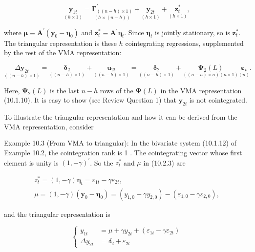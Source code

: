 \documentclass[10pt]{article}
\begin{document}
\begin{equation*}
\underset{(h \times 1)}{\mathbf{y}_{1 t}}=\underset{(h \times(n-h))}{\boldsymbol{\Gamma}_{((n-h) \times 1)}^{\prime}}+\underset{(h \times 1)}{\mathbf{y}_{2 t}}+\underset{(h \times 1)}{\mathbf{z}_{t}^{*}}, \tag{10.2.8}
\end{equation*}


where $\boldsymbol{\mu} \equiv \mathbf{A}^{\prime}\left(\mathbf{y}_{0}-\boldsymbol{\eta}_{0}\right)$ and $\mathbf{z}_{t}^{*} \equiv \mathbf{A}^{\prime} \boldsymbol{\eta}_{t}$. Since $\boldsymbol{\eta}_{t}$ is jointly stationary, so is $\mathbf{z}_{t}^{*}$. The triangular representation is these $h$ cointegrating regressions, supplemented by the rest of the VMA representation:


\begin{equation*}
\underset{((n-h) \times 1)}{\Delta \mathbf{y}_{2 t}}=\underset{((n-h) \times 1)}{\boldsymbol{\delta}_{2}}+\underset{((n-h) \times 1)}{\mathbf{u}_{2 t}}=\underset{((n-h) \times 1)}{\boldsymbol{\delta}_{2}}+\underset{((n-h) \times n)(n \times 1)}{\boldsymbol{\Psi}_{2}(L)} \underset{(n)}{\boldsymbol{\varepsilon}_{t}} . \tag{10.2.9}
\end{equation*}


Here, $\boldsymbol{\Psi}_{2}(L)$ is the last $n-h$ rows of the $\boldsymbol{\Psi}(L)$ in the VMA representation (10.1.10). It is easy to show (see Review Question 1) that $\mathbf{y}_{2 t}$ is not cointegrated.

To illustrate the triangular representation and how it can be derived from the VMA representation, consider

Example 10.3 (From VMA to triangular): In the bivariate system (10.1.12) of Example 10.2, the cointegration rank is 1 . The cointegrating vector whose first element is unity is $(1,-\gamma)^{\prime}$. So the $z_{t}^{*}$ and $\mu$ in (10.2.3) are


\begin{gather*}
z_{t}^{*}=(1,-\gamma) \boldsymbol{\eta}_{t}=\varepsilon_{1 t}-\gamma \varepsilon_{2 t}, \\
\mu=(1,-\gamma)\left(\mathbf{y}_{0}-\boldsymbol{\eta}_{0}\right)=\left(y_{1,0}-\gamma y_{2,0}\right)-\left(\varepsilon_{1,0}-\gamma \varepsilon_{2,0}\right), \tag{10.2.10}
\end{gather*}


and the triangular representation is

\[
\left\{\begin{align*}
y_{1 t} & =\mu+\gamma y_{2 t}+\left(\varepsilon_{1 t}-\gamma \varepsilon_{2 t}\right)  \tag{10.2.11}\\
\Delta y_{2 t} & =\delta_{2}+\varepsilon_{2 t}
\end{align*}\right.
\]
\end{document}
